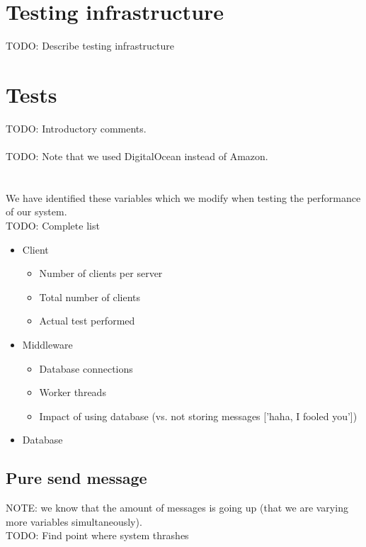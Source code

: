 \documentclass{article}
\begin{document}
    \section{Testing infrastructure}
        TODO: Describe testing infrastructure

    \section{Tests}
        TODO: Introductory comments.\\
        \\
        TODO: Note that we used DigitalOcean instead of Amazon.\\
        \\
        \\
        We have identified these variables which we modify when testing the performance of our system.\\
        TODO: Complete list
        \begin{itemize}
            \item Client
            \begin{itemize}
                \item Number of clients per server
                \item Total number of clients
                \item Actual test performed
            \end{itemize}
            \item Middleware
            \begin{itemize}
                \item Database connections
                \item Worker threads
                \item Impact of using database (vs. not storing messages ['haha, I fooled you'])
            \end{itemize}
            \item Database
        \end{itemize}

        \subsection{Pure send message}
            NOTE: we know that the amount of messages is going up (that we are varying more variables simultaneously).\\
            TODO: Find point where system thrashes
\end{document}
